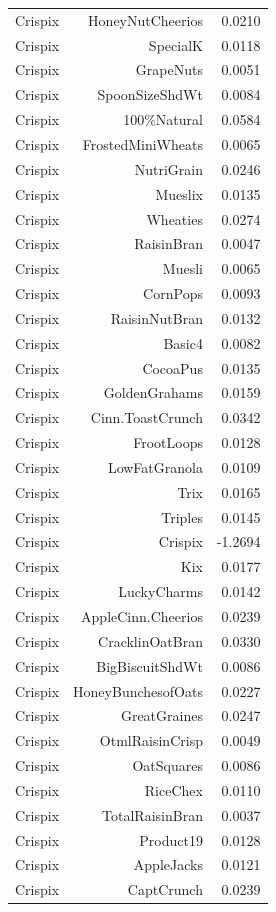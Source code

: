 \begin{longtable}{@{}lrr@{}}
Crispix & HoneyNutCheerios & 0.0210 \\
Crispix & SpecialK & 0.0118 \\
Crispix & GrapeNuts & 0.0051 \\
Crispix & SpoonSizeShdWt & 0.0084 \\
Crispix & 100\%Natural & 0.0584 \\
Crispix & FrostedMiniWheats & 0.0065 \\
Crispix & NutriGrain & 0.0246 \\
Crispix & Mueslix & 0.0135 \\
Crispix & Wheaties & 0.0274 \\
Crispix & RaisinBran & 0.0047 \\
Crispix & Muesli & 0.0065 \\
Crispix & CornPops & 0.0093 \\
Crispix & RaisinNutBran & 0.0132 \\
Crispix & Basic4 & 0.0082 \\
Crispix & CocoaPus & 0.0135 \\
Crispix & GoldenGrahams & 0.0159 \\
Crispix & Cinn.ToastCrunch & 0.0342 \\
Crispix & FrootLoops & 0.0128 \\
Crispix & LowFatGranola & 0.0109 \\
Crispix & Trix & 0.0165 \\
Crispix & Triples & 0.0145 \\
Crispix & Crispix & -1.2694 \\
Crispix & Kix & 0.0177 \\
Crispix & LuckyCharms & 0.0142 \\
Crispix & AppleCinn.Cheerios & 0.0239 \\
Crispix & CracklinOatBran & 0.0330 \\
Crispix & BigBiscuitShdWt & 0.0086 \\
Crispix & HoneyBunchesofOats & 0.0227 \\
Crispix & GreatGraines & 0.0247 \\
Crispix & OtmlRaisinCrisp & 0.0049 \\
Crispix & OatSquares & 0.0086 \\
Crispix & RiceChex & 0.0110 \\
Crispix & TotalRaisinBran & 0.0037 \\
Crispix & Product19 & 0.0128 \\
Crispix & AppleJacks & 0.0121 \\
Crispix & CaptCrunch & 0.0239 \\

\end{longtable}
